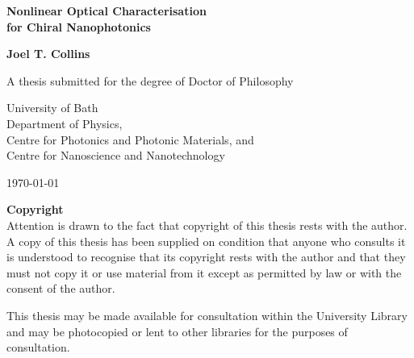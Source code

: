 \begin{center}
    \vspace*{1cm}
    
    \LARGE
    \textbf{Nonlinear Optical Characterisation \\for Chiral Nanophotonics}
    
    \vspace{0.5cm}
    \large
    \textbf{Joel T. Collins}
    
    \vspace{1.5cm}
    \normalsize
    A thesis submitted for the degree of Doctor of Philosophy
    
    \vspace{0.8cm}
    University of Bath\\
    Department of Physics,\\
    Centre for Photonics and Photonic Materials, and\\
    Centre for Nanoscience and Nanotechnology
    
    \vspace{0.5cm}
    \today
    
    \vspace{1.5cm}

    \textbf{Copyright}\\
    Attention is drawn to the fact that copyright of this thesis rests with the author. A copy of this thesis has been supplied on condition that anyone who consults it is understood to recognise that its copyright rests with the author and that they must not copy it or use material from it except as permitted by law or with the consent of the author. 

    \vspace{1.5cm}

    This thesis may be made available for consultation within the University Library and may be photocopied or lent to other libraries for the purposes of consultation. 

\end{center}